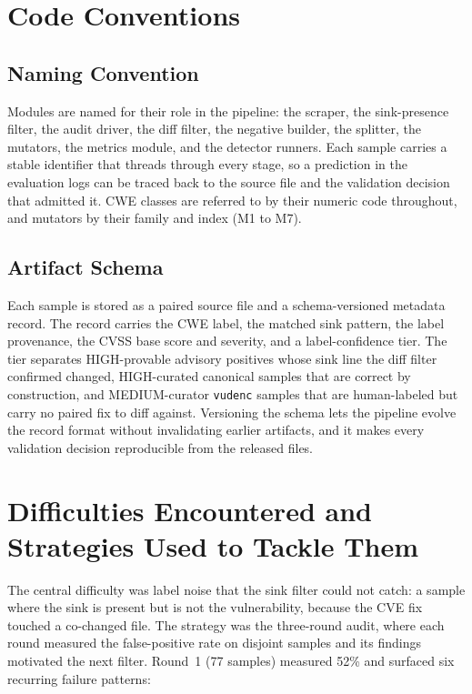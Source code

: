 \section{Code Conventions}

\subsection{Naming Convention}

Modules are named for their role in the pipeline: the scraper, the sink-presence
filter, the audit driver, the diff filter, the negative builder, the splitter,
the mutators, the metrics module, and the detector runners. Each sample carries a
stable identifier that threads through every stage, so a prediction in the
evaluation logs can be traced back to the source file and the validation decision
that admitted it. CWE classes are referred to by their numeric code throughout,
and mutators by their family and index (M1 to M7).

\subsection{Artifact Schema}

Each sample is stored as a paired source file and a schema-versioned metadata
record. The record carries the CWE label, the matched sink pattern, the label
provenance, the CVSS base score and severity, and a label-confidence tier. The
tier separates HIGH-provable advisory positives whose sink line the diff filter
confirmed changed, HIGH-curated canonical samples that are correct by
construction, and MEDIUM-curator \texttt{vudenc} samples that are human-labeled
but carry no paired fix to diff against. Versioning the schema lets the pipeline
evolve the record format without invalidating earlier artifacts, and it makes
every validation decision reproducible from the released files.

\section{Difficulties Encountered and Strategies Used to Tackle Them}

The central difficulty was label noise that the sink filter could not catch: a
sample where the sink is present but is not the vulnerability, because the CVE
fix touched a co-changed file. The strategy was the three-round audit, where each
round measured the false-positive rate on disjoint samples and its findings
motivated the next filter. Round~1 (77 samples) measured 52\% and surfaced six
recurring failure patterns:

